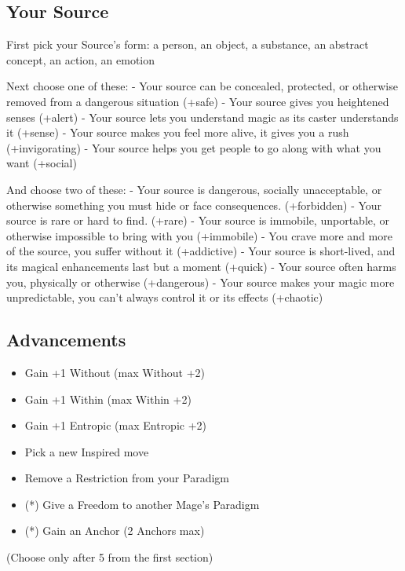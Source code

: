 \documentclass[
  oneside,
  statementpaper,
  9pt]{memoir}
\begin{document}
\hypertarget{your-source}{%
\subsection{Your Source}\label{your-source}}

First pick your Source's form: a person, an object, a substance, an
abstract concept, an action, an emotion

Next choose one of these: - Your source can be concealed, protected, or
otherwise removed from a dangerous situation (+safe) - Your source gives
you heightened senses (+alert) - Your source lets you understand magic
as its caster understands it (+sense) - Your source makes you feel more
alive, it gives you a rush (+invigorating) - Your source helps you get
people to go along with what you want (+social)

And choose two of these: - Your source is dangerous, socially
unacceptable, or otherwise something you must hide or face consequences.
(+forbidden) - Your source is rare or hard to find. (+rare) - Your
source is immobile, unportable, or otherwise impossible to bring with
you (+immobile) - You crave more and more of the source, you suffer
without it (+addictive) - Your source is short-lived, and its magical
enhancements last but a moment (+quick) - Your source often harms you,
physically or otherwise (+dangerous) - Your source makes your magic more
unpredictable, you can't always control it or its effects (+chaotic)

\hypertarget{advancements-2}{%
\subsection{Advancements}\label{advancements-2}}

\begin{itemize}
\tightlist
\item
  Gain +1 Without (max Without +2)
\item
  Gain +1 Within (max Within +2)
\item
  Gain +1 Entropic (max Entropic +2)
\item
  Pick a new Inspired move
\item
  Remove a Restriction from your Paradigm
\item
  (*) Give a Freedom to another Mage's Paradigm
\item
  (*) Gain an Anchor (2 Anchors max)
\end{itemize}

(Choose only after 5 from the first section)
\end{document}
